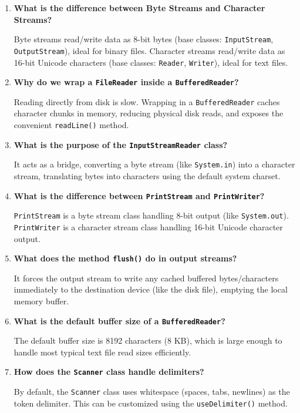 \documentclass[12pt,a4paper]{article}
\newcommand{\Q}[1]{\textbf{#1}\par\noindent\ignorespaces}
\begin{document}
\begin{tcolorbox}[exambox, title={\textbf{Frequently Asked / Viva Questions}}]
\begin{enumerate}[leftmargin=*, label=\textbf{Q\arabic*.}, itemsep=5pt]
  \item \Q{What is the difference between Byte Streams and Character Streams?}
        Byte streams read/write data as 8-bit bytes (base classes: \texttt{InputStream}, \texttt{OutputStream}), ideal for binary files. Character streams read/write data as 16-bit Unicode characters (base classes: \texttt{Reader}, \texttt{Writer}), ideal for text files.
        
  \item \Q{Why do we wrap a \texttt{FileReader} inside a \texttt{BufferedReader}?}
        Reading directly from disk is slow. Wrapping in a \texttt{BufferedReader} caches character chunks in memory, reducing physical disk reads, and exposes the convenient \texttt{readLine()} method.
        
  \item \Q{What is the purpose of the \texttt{InputStreamReader} class?}
        It acts as a bridge, converting a byte stream (like \texttt{System.in}) into a character stream, translating bytes into characters using the default system charset.
        
  \item \Q{What is the difference between \texttt{PrintStream} and \texttt{PrintWriter}?}
        \texttt{PrintStream} is a byte stream class handling 8-bit output (like \texttt{System.out}). \texttt{PrintWriter} is a character stream class handling 16-bit Unicode character output.
        
  \item \Q{What does the method \texttt{flush()} do in output streams?}
        It forces the output stream to write any cached buffered bytes/characters immediately to the destination device (like the disk file), emptying the local memory buffer.
        
  \item \Q{What is the default buffer size of a \texttt{BufferedReader}?}
        The default buffer size is 8192 characters (8 KB), which is large enough to handle most typical text file read sizes efficiently.
        
  \item \Q{How does the \texttt{Scanner} class handle delimiters?}
        By default, the \texttt{Scanner} class uses whitespace (spaces, tabs, newlines) as the token delimiter. This can be customized using the \texttt{useDelimiter()} method.
        

\end{enumerate}
\end{tcolorbox}
\end{document}
